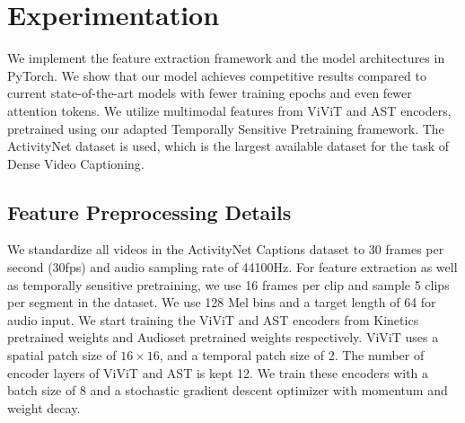 \section{Experimentation}
\par We implement the feature extraction framework and the model architectures in PyTorch. We show that our model achieves competitive results compared to current state-of-the-art models with fewer training epochs and even fewer attention tokens. We utilize multimodal features from ViViT and AST encoders, pretrained using our adapted Temporally Sensitive Pretraining framework. The ActivityNet dataset is used, which is the largest available dataset for the task of Dense Video Captioning.

\subsection{Feature Preprocessing Details}
\par We standardize all videos in the ActivityNet Captions dataset to 30 frames per second (30fps) and audio sampling rate of 44100Hz. For feature extraction as well as temporally sensitive pretraining, we use 16 frames per clip and sample 5 clips per segment in the dataset. We use 128 Mel bins and a target length of 64 for audio input. We start training the ViViT and AST encoders from Kinetics pretrained weights and Audioset pretrained weights respectively. ViViT uses a spatial patch size of $16 \times 16$, and a temporal patch size of 2. The number of encoder layers of ViViT and AST is kept 12. We train these encoders with a batch size of 8 and a stochastic gradient descent optimizer with momentum and weight decay.

